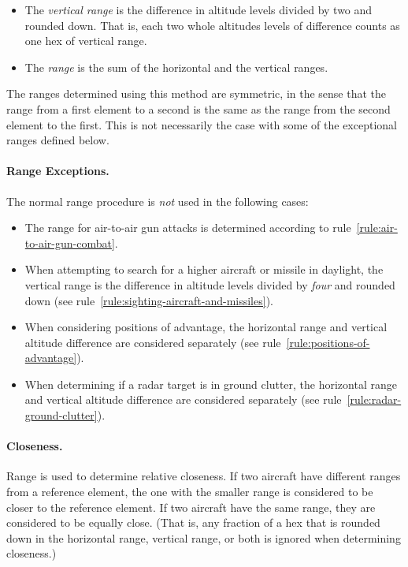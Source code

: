 {\begin{itemize}
Figure~\ref{figure:range-example} gives examples of horizontal ranges.

\item
The \emph{vertical range} is the difference in altitude levels divided by two and rounded down. That is, each two whole altitudes levels of difference counts as one hex of vertical range.
\item
The \emph{range} is the sum of the horizontal and the vertical ranges.
\end{itemize}

The ranges determined using this method are symmetric, in the sense that the range from a first element to a second is the same as the range from the second element to the first. This is not necessarily the case with some of the exceptional ranges defined below.

\paragraph{Range Exceptions.}
The normal range procedure is \emph{not} used in the following cases:
\begin{itemize}

\item
The range for air-to-air gun attacks is determined according to rule~\ref{rule:air-to-air-gun-combat}.

\item
When attempting to search for a higher aircraft or missile in daylight, the vertical range is the difference in altitude levels divided by \emph{four} and rounded down (see rule~\ref{rule:sighting-aircraft-and-missiles}).

\item
When considering positions of advantage, the horizontal range and vertical altitude difference are considered separately (see rule~\ref{rule:positions-of-advantage}).

\item
When determining if a radar target is in ground clutter, the horizontal range and vertical altitude difference are considered separately (see rule~\ref{rule:radar-ground-clutter}).

\end{itemize}

\paragraph{Closeness.}
\label{rule:closeness}

Range is used to determine relative closeness. If two aircraft have different ranges from a reference element, the one with the smaller range is considered to be closer to the reference element. If two aircraft have the same range, they are considered to be equally close. (That is, any fraction of a hex that is rounded down in the horizontal range, vertical range, or both is ignored when determining closeness.)

}
